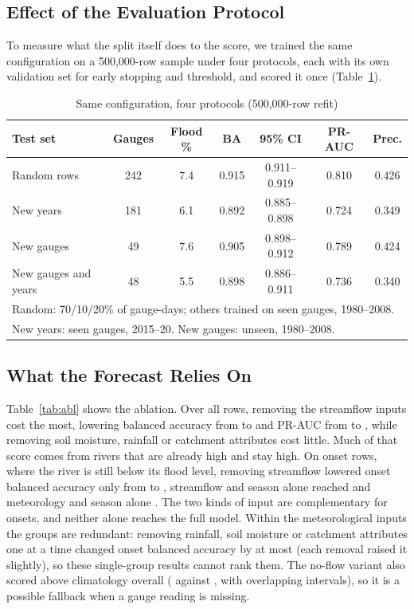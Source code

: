 \documentclass[conference]{IEEEtran}
\begin{document}
\subsection{Effect of the Evaluation Protocol}
To measure what the split itself does to the score, we trained the same configuration on a 500,000-row sample under four protocols, each with its own validation set for early stopping and threshold, and scored it once (Table~\ref{tab:leak}). \LeakText{}

\begin{table}[t]
\caption{Same configuration, four protocols (500,000-row refit)}
\label{tab:leak}
\centering
\footnotesize
\setlength{\tabcolsep}{1.4pt}
\begin{tabular}{lcccccc}
\toprule
Test set & Gauges & Flood \% & BA & 95\% CI & PR-AUC & Prec.\\
\midrule
Random rows & 242 & 7.4 & 0.915 & 0.911--0.919 & 0.810 & 0.426\\
New years & 181 & 6.1 & 0.892 & 0.885--0.898 & 0.724 & 0.349\\
New gauges & 49 & 7.6 & 0.905 & 0.898--0.912 & 0.789 & 0.424\\
New gauges and years & 48 & 5.5 & 0.898 & 0.886--0.911 & 0.736 & 0.340\\
\bottomrule
\multicolumn{7}{l}{\scriptsize Random: 70/10/20\% of gauge-days; others trained on seen gauges, 1980--2008.}\\
\multicolumn{7}{l}{\scriptsize New years: seen gauges, 2015--20. New gauges: unseen, 1980--2008.}\\
\end{tabular}
\end{table}

\subsection{What the Forecast Relies On}
Table~\ref{tab:abl} shows the ablation. Over all rows, removing the streamflow inputs cost the most, lowering balanced accuracy from \AblAllBA{} to \NoFlowBA{} and PR-AUC from \AblAllPR{} to \NoFlowPR, while removing soil moisture, rainfall or catchment attributes cost little. Much of that score comes from rivers that are already high and stay high. On onset rows, where the river is still below its flood level, removing streamflow lowered onset balanced accuracy only from \OnsetAll{} to \OnsetNoFlow, streamflow and season alone reached \OnsetFlowOnly{} and meteorology and season alone \MetOnBA. The two kinds of input are complementary for onsets, and neither alone reaches the full model. Within the meteorological inputs the groups are redundant: removing rainfall, soil moisture or catchment attributes one at a time changed onset balanced accuracy by at most \AblOnMaxDelta{} (each removal raised it slightly), so these single-group results cannot rank them. The no-flow variant also scored above climatology overall (\NoFlowBA{} against \ClimBA, with overlapping intervals), so it is a possible fallback when a gauge reading is missing.
\end{document}
